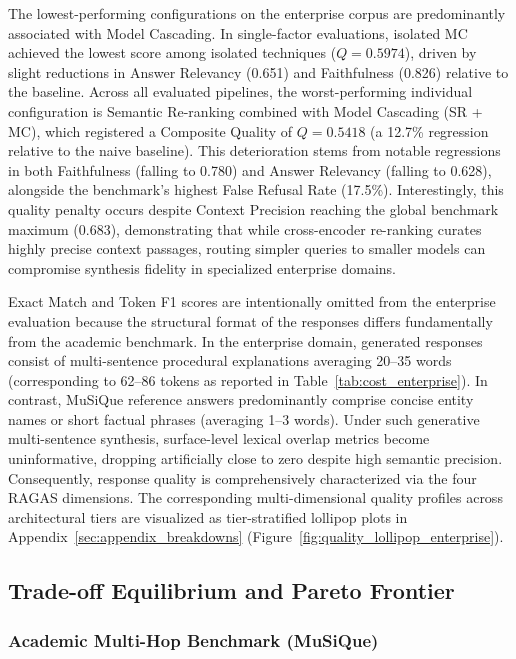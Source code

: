 

The lowest-performing configurations on the enterprise corpus are predominantly associated with Model Cascading. In single-factor evaluations, isolated MC achieved the lowest score among isolated techniques ($Q = 0.5974$), driven by slight reductions in Answer Relevancy (0.651) and Faithfulness (0.826) relative to the baseline. Across all evaluated pipelines, the worst-performing individual configuration is Semantic Re-ranking combined with Model Cascading (SR + MC), which registered a Composite Quality of $Q = 0.5418$ (a 12.7\% regression relative to the naive baseline). This deterioration stems from notable regressions in both Faithfulness (falling to 0.780) and Answer Relevancy (falling to 0.628), alongside the benchmark's highest False Refusal Rate (17.5\%). Interestingly, this quality penalty occurs despite Context Precision reaching the global benchmark maximum (0.683), demonstrating that while cross-encoder re-ranking curates highly precise context passages, routing simpler queries to smaller models can compromise synthesis fidelity in specialized enterprise domains.

Exact Match and Token F1 scores are intentionally omitted from the enterprise evaluation because the structural format of the responses differs fundamentally from the academic benchmark. In the enterprise domain, generated responses consist of multi-sentence procedural explanations averaging 20--35 words (corresponding to 62--86 tokens as reported in Table~\ref{tab:cost_enterprise}). In contrast, MuSiQue reference answers predominantly comprise concise entity names or short factual phrases (averaging 1--3 words). Under such generative multi-sentence synthesis, surface-level lexical overlap metrics become uninformative, dropping artificially close to zero despite high semantic precision. Consequently, response quality is comprehensively characterized via the four RAGAS dimensions. The corresponding multi-dimensional quality profiles across architectural tiers are visualized as tier-stratified lollipop plots in Appendix~\ref{sec:appendix_breakdowns} (Figure~\ref{fig:quality_lollipop_enterprise}).

\FloatBarrier
\subsection{Trade-off Equilibrium and Pareto Frontier}
\label{subsec:results_pareto}

\subsubsection{Academic Multi-Hop Benchmark (MuSiQue)}
\label{subsubsec:pareto_musique}

